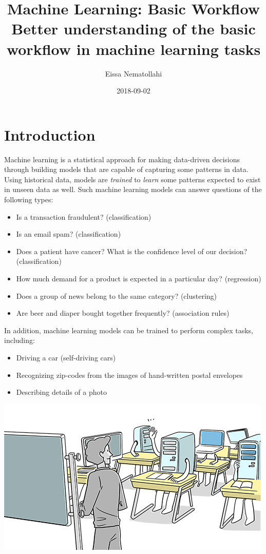 \documentclass[11pt]{article}
\author{Eissa Nematollahi}
\date{2018-09-02}
\title{Machine Learning: Basic Workflow\\\medskip
\large Better understanding of the basic workflow in machine learning tasks}
\begin{document}
\maketitle
\tableofcontents
\clearpage 

\section{Introduction}
\label{sec:orgheadline1}
Machine learning is a statistical approach for making data-driven decisions through building models that are capable of capturing some patterns in data. Using historical data, models are \emph{trained} to \emph{learn} some patterns expected to exist in unseen data as well. Such machine learning models can answer questions of the following types:
\begin{itemize}
\item Is a transaction fraudulent? (classification)
\item Is an email spam? (classification)
\item Does a patient have cancer? What is the confidence level of our decision? (classification)
\item How much demand for a product is expected in a particular day? (regression)
\item Does a group of news belong to the same category? (clustering)
\item Are beer and diaper bought together frequently? (association rules)
\end{itemize}
In addition, machine learning models can be trained to perform complex tasks, including:
\begin{itemize}
\item Driving a car (self-driving cars)
\item Recognizing zip-codes from the images of hand-written postal envelopes
\item Describing details of a photo
\end{itemize}

\includegraphics[width=.9\linewidth]{./images/machine-learning.png}
\end{document}
